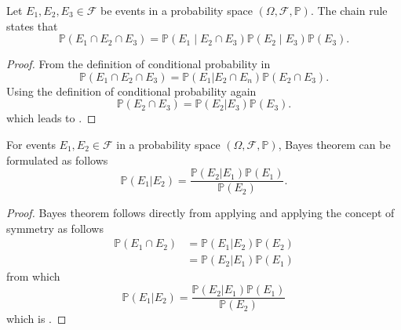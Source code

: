 \begin{theorem}
	\label{theorem:chain_rule}
	Let $E_1, E_2, E_3 \in \mathcal{F}$ be events in a probability space $(\Omega, \mathcal{F}, \mathbb{P})$. The chain rule states that
	\begin{equation}
		\mathbb{P}(E_1 \cap E_2 \cap E_3) 
		=\mathbb{P}(E_1 \mid E_2 \cap E_3)\mathbb{P}(E_2 \mid E_3)\mathbb{P}(E_3).
		\label{eq:prod}
	\end{equation}
\end{theorem}

\begin{proof}
	From the definition of conditional probability in 
	\begin{equation}
		\mathbb{P}(E_1 \cap E_2 \cap E_3) = \mathbb{P}(E_1|E_2 \cap E_n)\mathbb{P}(E_2 \cap E_3).
		\label{eq:p1}
	\end{equation}
	Using the definition of conditional probability again
	\begin{equation}
		\mathbb{P}(E_2 \cap E_3) = \mathbb{P}(E_2| E_3)\mathbb{P}(E_3).
	\end{equation}
	which leads to .
\end{proof}

\begin{theorem}
	\label{theorem:bayes_theorem}
	For events $E_1,E_2 \in \mathcal{F}$ in a probability space $(\Omega, \mathcal{F}, \mathbb{P})$, Bayes theorem can be formulated as follows
	\begin{equation}
		\mathbb{P}(E_1| E_2) = \frac{\mathbb{P}(E_2| E_1)\mathbb{P}(E_1)}{\mathbb{P}(E_2)}.
		\label{bayes_theorem}
	\end{equation}
\end{theorem}

\begin{proof}
	Bayes theorem follows directly from applying  and applying the concept of symmetry as follows
	\begin{equation}
		\begin{split}
			\mathbb{P}(E_1 \cap E_2) &= \mathbb{P}(E_1| E_2)\mathbb{P}(E_2) \\
			& = \mathbb{P}(E_2|E_1)\mathbb{P}(E_1)
		\end{split}
		\label{eq:c2}
	\end{equation}
	from which
	\begin{equation}
		\mathbb{P}(E_1| E_2) = \frac{\mathbb{P}(E_2| E_1)\mathbb{P}(E_1)}{\mathbb{P}(E_2)}
	\end{equation}
	which is .
\end{proof}

